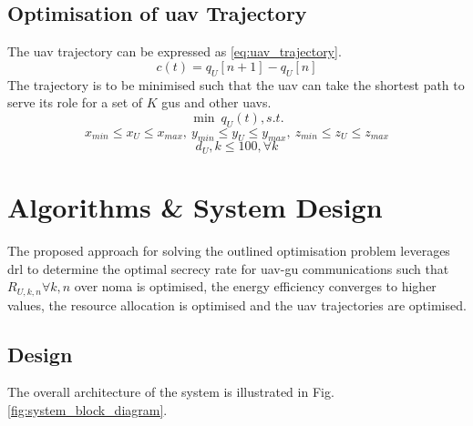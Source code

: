 \subsection{Optimisation of \texorpdfstring{\acrshort{uav}}{UAV} Trajectory}
The \acrshort{uav} trajectory can be expressed as \ref{eq:uav_trajectory}.
\begin{equation} \label{eq:uav_trajectory}
   c(t) = q_{U}[n+1] - q_{U}[n]
\end{equation}
The trajectory is to be minimised such that the \acrshort{uav} can take the shortest path to serve its role for a set of $K$ \acrshort{gu}s and other \acrshort{uav}s. 
\begin{equation} \label{eq:uav_trajectory_objective_function}
   \underset{}{\min}\ q_{U}(t), s.t.
\end{equation}
\begin{equation}\label{eq:traj_boundary_constraints}
    x_{min} \le x_{U} \le x_{max},\ y_{min} \le y_{U} \le y_{max},\ z_{min} \le z_{U} \le z_{max}
\end{equation}
\begin{equation} \label{eq:distance_constraint}
    d_{U}, k \le 100, \forall k
\end{equation}
\section{Algorithms \& System Design}
The proposed approach for solving the outlined optimisation problem leverages \acrshort{drl} to determine the optimal secrecy rate for \acrshort{uav}-\acrshort{gu} communications such that $R_{U, k, n} \forall k, n$ over \acrshort{noma} is optimised, the energy efficiency converges to higher values, the resource allocation is optimised and the \acrshort{uav} trajectories are optimised. 
\subsection{Design}
The overall architecture of the system is illustrated in Fig. \ref{fig:system_block_diagram}. 

